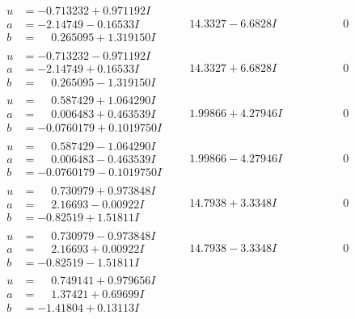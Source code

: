 \documentclass[1p]{elsarticle_modified}
\theoremstyle{definition}
\begin{document}
$$\begin{array}{c|c|c}
\begin{aligned}
u &= -0.713232 + 0.971192 I \\
a &= -2.14749 - 0.16533 I \\
b &= \phantom{-}0.265095 + 1.319150 I\end{aligned}
 & \phantom{-}14.3327 - 6.6828 I & \phantom{-0.000000 } 0 \\ \hline\begin{aligned}
u &= -0.713232 - 0.971192 I \\
a &= -2.14749 + 0.16533 I \\
b &= \phantom{-}0.265095 - 1.319150 I\end{aligned}
 & \phantom{-}14.3327 + 6.6828 I & \phantom{-0.000000 } 0 \\ \hline\begin{aligned}
u &= \phantom{-}0.587429 + 1.064290 I \\
a &= \phantom{-}0.006483 + 0.463539 I \\
b &= -0.0760179 + 0.1019750 I\end{aligned}
 & \phantom{-}1.99866 + 4.27946 I & \phantom{-0.000000 } 0 \\ \hline\begin{aligned}
u &= \phantom{-}0.587429 - 1.064290 I \\
a &= \phantom{-}0.006483 - 0.463539 I \\
b &= -0.0760179 - 0.1019750 I\end{aligned}
 & \phantom{-}1.99866 - 4.27946 I & \phantom{-0.000000 } 0 \\ \hline\begin{aligned}
u &= \phantom{-}0.730979 + 0.973848 I \\
a &= \phantom{-}2.16693 - 0.00922 I \\
b &= -0.82519 + 1.51811 I\end{aligned}
 & \phantom{-}14.7938 + 3.3348 I & \phantom{-0.000000 } 0 \\ \hline\begin{aligned}
u &= \phantom{-}0.730979 - 0.973848 I \\
a &= \phantom{-}2.16693 + 0.00922 I \\
b &= -0.82519 - 1.51811 I\end{aligned}
 & \phantom{-}14.7938 - 3.3348 I & \phantom{-0.000000 } 0 \\ \hline\begin{aligned}
u &= \phantom{-}0.749141 + 0.979656 I \\
a &= \phantom{-}1.37421 + 0.69699 I \\
b &= -1.41804 + 0.13113 I\end{aligned}

\end{array}$$
\end{document}

